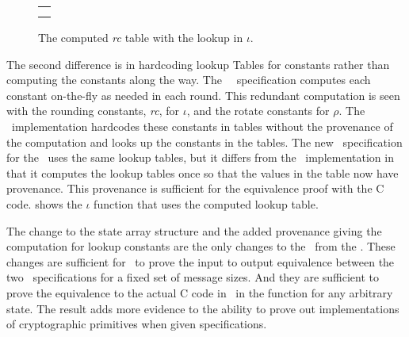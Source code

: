 \begin{figure}[t]
  \begin{center}
    \begin{tabular}{l}
      \usebox{\cryciota} \\ \\
    \end{tabular}
  \end{center}
  \caption{The computed \emph{rc} table with the lookup in $\iota$.}
  \label{fig:iota}
\end{figure}

The second difference is in hardcoding lookup Tables for constants rather than computing the constants along the way.
The \fips\ \cryptol\ specification computes each constant on-the-fly as needed in each round.
This redundant computation is seen with the rounding constants, \emph{rc}, for $\iota$, and the rotate constants for $\rho$. 
The \openssl\ implementation hardcodes these constants in tables without the provenance of the computation and looks up the constants in the tables.
The new \cryptol\ specification for the \openssl\ uses the same lookup tables, but it differs from the \openssl\ implementation in that it computes the lookup tables once so that the values in the table now have provenance.
This provenance is sufficient for the equivalence proof with the C code.
 shows the $\iota$ function that uses the computed lookup table.

The change to the state array structure and the added provenance giving the computation for lookup constants are the only changes to the \cryptol\ from the \fips.
These changes are sufficient for \saw\ to prove the input to output equivalence between the two \cryptol\ specifications for a fixed set of message sizes.
And they are sufficient to prove the equivalence to the actual C code in \openssl\ in the \keccak function for any arbitrary state.
The result adds more evidence to the ability to prove out implementations of cryptographic primitives when given specifications. 